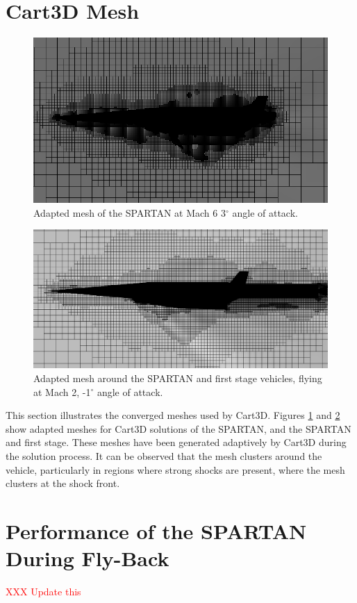 \FloatBarrier
\section{Cart3D Mesh}
\begin{figure}[ht]
	\centering
	\includegraphics[width=0.7\linewidth]{figures/3_vehicle_design/M3AoA6GRID}
	\caption{Adapted mesh of the SPARTAN at Mach 6 3$^\circ$ angle of attack.}
	\label{fig:M3AoA6GRID}
\end{figure}

\begin{figure}[ht]
	\centering
	\includegraphics[width=0.7\linewidth]{figures/3_vehicle_design/CARTmesh}
	\caption{Adapted mesh around the SPARTAN and first stage vehicles, flying at Mach 2, -1$^\circ$ angle of attack.}
	\label{fig:CARTmesh}
\end{figure}
This section illustrates the converged meshes used by Cart3D.
Figures \ref{fig:M3AoA6GRID} and \ref{fig:CARTmesh} show adapted meshes for Cart3D solutions of the SPARTAN, and the SPARTAN and first stage. These meshes have been generated adaptively by Cart3D during the solution process. It can be observed that the mesh clusters around the vehicle, particularly in regions where strong shocks are present, where the mesh clusters at the shock front. 



\FloatBarrier
\section{Performance of the SPARTAN During Fly-Back}
\textcolor{red}{XXX Update this}

